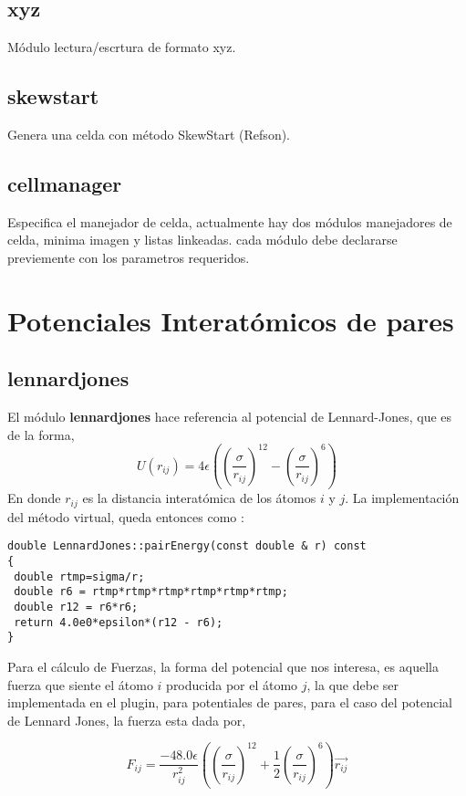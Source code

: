 \documentclass[a4paper,10pt]{scrbook}
\begin{document}
\subsection{xyz}
M\'odulo lectura/escrtura de formato xyz.
\subsection{skewstart}
Genera una celda con m\'etodo SkewStart (Refson).
\subsection{cellmanager}
Especifica el manejador de celda, actualmente hay dos m\'odulos manejadores de celda, minima imagen y listas linkeadas. cada m\'odulo debe declararse previemente con los parametros requeridos.

\section{Potenciales Interat\'omicos de pares}
\subsection{lennardjones}
El m\'odulo \textbf{lennardjones} hace referencia al potencial de Lennard-Jones, que es de la forma,
$$U(r_{ij}) = 4\epsilon\left(\left(\frac{\sigma}{r_{ij}}\right)^{12}-\left(\frac{\sigma}{r_{ij}}\right)^6\right)$$
En donde $r_{ij}$ es la distancia interat\'omica de los \'atomos $i$ y $j$. La implementaci\'on del m\'etodo virtual, queda entonces como :
\begin{verbatim}
double LennardJones::pairEnergy(const double & r) const
{
 double rtmp=sigma/r;
 double r6 = rtmp*rtmp*rtmp*rtmp*rtmp*rtmp;
 double r12 = r6*r6;
 return 4.0e0*epsilon*(r12 - r6);
}
\end{verbatim}

Para el c\'alculo de Fuerzas, la forma del potencial que nos interesa, es aquella fuerza que siente el \'atomo $i$ producida por el \'atomo $j$, la que debe ser implementada en el plugin, para potentiales de pares, para el caso del potencial de Lennard Jones, la fuerza esta dada por,

$$F_{ij} = \frac{-48.0\epsilon}{r_{ij}^2}\left( \left(\frac{\sigma}{r_{ij}}\right)^{12} + \frac{1}{2}\left(\frac{\sigma}{r_{ij}}\right)^6 \right) \vec{r_{ij}}$$
\end{document}
